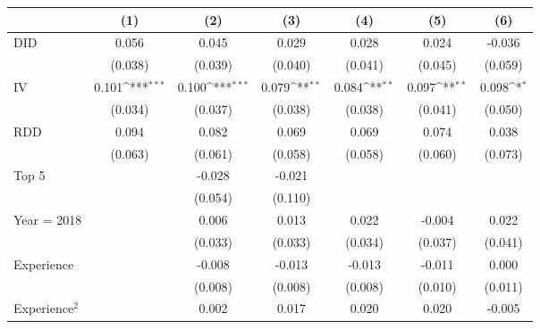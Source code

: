 {
\def\sym#1{\ifmmode^{#1}\else\(^{#1}\)\fi}
\begin{tabular}{l*{6}{c}}
\hline\hline
                &\multicolumn{1}{c}{(1)}         &\multicolumn{1}{c}{(2)}         &\multicolumn{1}{c}{(3)}         &\multicolumn{1}{c}{(4)}         &\multicolumn{1}{c}{(5)}         &\multicolumn{1}{c}{(6)}         \\
\hline
DID             &    0.056         &    0.045         &    0.029         &    0.028         &    0.024         &   -0.036         \\
                &  (0.038)         &  (0.039)         &  (0.040)         &  (0.041)         &  (0.045)         &  (0.059)         \\
IV              &    0.101\sym{***}&    0.100\sym{***}&    0.079\sym{**} &    0.084\sym{**} &    0.097\sym{**} &    0.098\sym{*}  \\
                &  (0.034)         &  (0.037)         &  (0.038)         &  (0.038)         &  (0.041)         &  (0.050)         \\
RDD             &    0.094         &    0.082         &    0.069         &    0.069         &    0.074         &    0.038         \\
                &  (0.063)         &  (0.061)         &  (0.058)         &  (0.058)         &  (0.060)         &  (0.073)         \\
Top 5           &                  &   -0.028         &   -0.021         &                  &                  &                  \\
                &                  &  (0.054)         &  (0.110)         &                  &                  &                  \\
Year = 2018     &                  &    0.006         &    0.013         &    0.022         &   -0.004         &    0.022         \\
                &                  &  (0.033)         &  (0.033)         &  (0.034)         &  (0.037)         &  (0.041)         \\
Experience      &                  &   -0.008         &   -0.013         &   -0.013         &   -0.011         &    0.000         \\
                &                  &  (0.008)         &  (0.008)         &  (0.008)         &  (0.010)         &  (0.011)         \\
Experience$^2$  &                  &    0.002         &    0.017         &    0.020         &    0.020         &   -0.005         \\

\end{tabular}}
